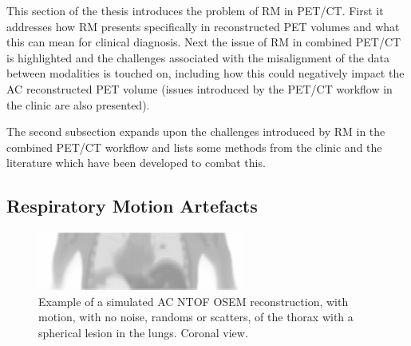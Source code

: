         This section of the thesis introduces the problem of \gls{RM} in \gls{PET}/\gls{CT}. First it addresses how \gls{RM} presents specifically in reconstructed \gls{PET} volumes and what this can mean for clinical diagnosis. Next the issue of \gls{RM} in combined \gls{PET}/\gls{CT} is highlighted and the challenges associated with the misalignment of the data between modalities is touched on, including how this could negatively impact the \gls{AC} reconstructed \gls{PET} volume (issues introduced by the \gls{PET}/\gls{CT} workflow in the clinic are also presented).
            
        The second subsection expands upon the challenges introduced by \gls{RM} in the combined \gls{PET}/\gls{CT} workflow and lists some methods from the clinic and the literature which have been developed to combat this.
        
        \subsection{Respiratory Motion Artefacts} \label{sec:respiratory_motion_artefacts}
            
            \begin{figure}
                \centering
                
                \includegraphics[width=1.0\linewidth]{figures/background_motion_artefact_example.png}
                
                \captionsetup{singlelinecheck=false, justification=raggedright}
                \caption{Example of a simulated \gls{AC} \gls{NTOF} \gls{OSEM} reconstruction, with motion, with no noise, randoms or scatters, of the thorax with a spherical lesion in the lungs. Coronal view.}
                \label{fig:respiratory_motion_artefacts_motion_artefact}
            \end{figure}
            
